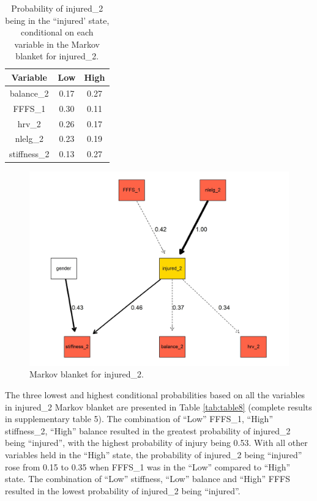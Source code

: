 \documentclass[
  english,
  man]{apa6}
\begin{document}
\begin{table}[H]

\caption{\label{tab:table7}Probability of injured\_2 being in the ``injured' state, conditional on each variable in the Markov blanket for injured\_2.}
\centering
\begin{tabular}[t]{c|c|c}
\hline
\textbf{Variable} & \textbf{Low} & \textbf{High}\\
\hline
balance\_2 & 0.17 & 0.27\\
\hline
FFFS\_1 & 0.30 & 0.11\\
\hline
hrv\_2 & 0.26 & 0.17\\
\hline
nlelg\_2 & 0.23 & 0.19\\
\hline
stiffness\_2 & 0.13 & 0.27\\
\hline
\end{tabular}
\end{table}

\begin{figure}

{\centering \includegraphics[width=1\linewidth]{figures_doc/Fig8} 

}

\caption{Markov blanket for injured\_2.}\label{fig:fig8}
\end{figure}

The three lowest and highest conditional probabilities based on all the variables in injured\_2 Markov blanket are presented in Table \ref{tab:table8} (complete results in supplementary table 5).
The combination of ``Low'' FFFS\_1, ``High'' stiffness\_2, ``High'' balance resulted in the greatest probability of injured\_2 being ``injured'', with the highest probability of injury being 0.53.
With all other variables held in the ``High'' state, the probability of injured\_2 being ``injured'' rose from 0.15 to 0.35 when FFFS\_1 was in the ``Low'' compared to ``High'' state.
The combination of ``Low'' stiffness, ``Low'' balance and ``High'' FFFS resulted in the lowest probability of injured\_2 being ``injured''.
\end{document}
